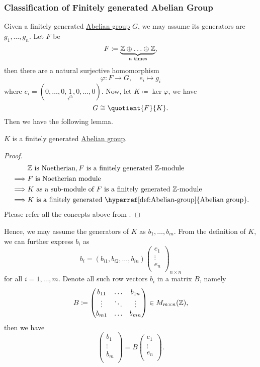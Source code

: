 \subsubsection{Classification of Finitely generated Abelian Group}
Given a finitely generated \hyperref[def:Abelian-group]{Abelian group} \(G\), we may assume its generators are \(g_1, \ldots , g_n \). Let \(F\) be
\[
	F\coloneqq \underbrace{\mathbb{\MakeUppercase{z}} \oplus \ldots \oplus \mathbb{\MakeUppercase{z}}  }_{n \text{ times}},
\]
then there are a natural surjective homomorphism
\[
	\varphi \colon F\to G,\quad e_{i} \mapsto g_{i}
\]
where \(e_{i} = (0, \ldots , 0, \underset{i^{th} }{1}, 0, \ldots , 0  )\). Now, let \(K\coloneqq \ker \varphi  \), we have
\[
	G \cong \quotient{F}{K}.
\]
Then we have the following lemma.
\begin{lemma}
	\(K\) is a finitely generated \hyperref[def:Abelian-group]{Abelian group}.
\end{lemma}
\begin{proof}
	\[
		\begin{split}
			&\mathbb{\MakeUppercase{z}} \text{ is Noetherian}, F \text{ is a finitely generated \(\mathbb{Z}\)-module }  \\
			\implies &F \text{ is Noetherian module}\\
			\implies &\text{\(K\) as a sub-module of \(F\) is a finitely generated \(\mathbb{Z}\)-module } \\
			\implies &\text{\(K\) is a finitely generated \hyperref[def:Abelian-group]{Abelian group}}.
		\end{split}
	\]
	Please refer all the concepts above from \cite{atiyah1994introduction}.
\end{proof}

Hence, we may assume the generators of \(K\) as \(b_1, \ldots , b_{m}\). From the definition of \(K\), we can further express \(b_{i}\) as
\[
	b_{i} = (b_{i1}, b_{i2}, \ldots , b_{in})\begin{pmatrix}
		e_{1}  \\
		\vdots \\
		e_{n}  \\
	\end{pmatrix}_{n \times n}
\]
for all \(i = 1, \ldots , m \). Denote all such row vectors \(b_{i} \) in a matrix \(B\), namely
\[
	B \coloneqq \begin{pmatrix}
		b_{11} & \ldots & b_{1n} \\
		\vdots & \ddots & \vdots \\
		b_{m1} & \ldots & b_{mn} \\
	\end{pmatrix}\in M_{m\times n} ({\mathbb{\MakeUppercase{z}} }),
\]
then we have
\[
	\begin{pmatrix}
		b_1    \\
		\vdots \\
		b_m    \\
	\end{pmatrix} = B\begin{pmatrix}
		e_{1}  \\
		\vdots \\
		e_{n}  \\
	\end{pmatrix}.
\]

